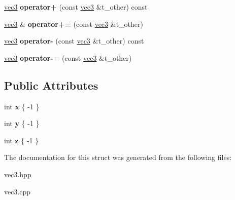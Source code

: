 \begin{DoxyCompactItemize}
\mbox{\hyperlink{structhw_1_1vec3}{vec3}} {\bfseries operator+} (const \mbox{\hyperlink{structhw_1_1vec3}{vec3}} \&t\+\_\+other) const
\item 
\mbox{\label{structhw_1_1vec3_ac023694cf167d773a6cf596c957228a4}} 
\mbox{\hyperlink{structhw_1_1vec3}{vec3}} \& {\bfseries operator+=} (const \mbox{\hyperlink{structhw_1_1vec3}{vec3}} \&t\+\_\+other)
\item 
\mbox{\label{structhw_1_1vec3_a6ae6dbc2e37bb7d537da615fb7c92d6e}} 
\mbox{\hyperlink{structhw_1_1vec3}{vec3}} {\bfseries operator-\/} (const \mbox{\hyperlink{structhw_1_1vec3}{vec3}} \&t\+\_\+other) const
\item 
\mbox{\label{structhw_1_1vec3_a25619ebcbdac7c21332c8aac1857ebbe}} 
\mbox{\hyperlink{structhw_1_1vec3}{vec3}} {\bfseries operator-\/=} (const \mbox{\hyperlink{structhw_1_1vec3}{vec3}} \&t\+\_\+other)
\end{DoxyCompactItemize}
\subsection*{Public Attributes}
\begin{DoxyCompactItemize}
\item 
\mbox{\label{structhw_1_1vec3_a3736c792e92f08495ec6f999ec330c4d}} 
int {\bfseries x} \{ -\/1 \}
\item 
\mbox{\label{structhw_1_1vec3_af437f78c0bc725419fce29142c37deb9}} 
int {\bfseries y} \{ -\/1 \}
\item 
\mbox{\label{structhw_1_1vec3_a8bbe766cc624a11d04c2a483fbacc069}} 
int {\bfseries z} \{ -\/1 \}
\end{DoxyCompactItemize}


The documentation for this struct was generated from the following files\+:\begin{DoxyCompactItemize}
\item 
vec3.\+hpp\item 
vec3.\+cpp\end{DoxyCompactItemize}

